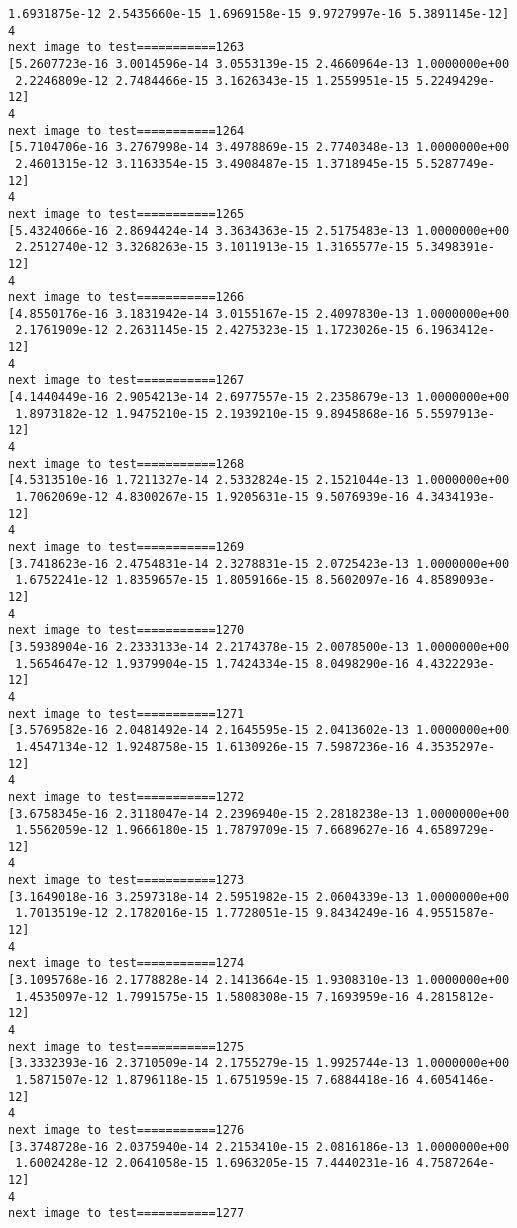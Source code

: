 \documentclass[11pt]{article}
\begin{document}
\begin{Verbatim}[commandchars=\\\{\}]
 1.6931875e-12 2.5435660e-15 1.6969158e-15 9.9727997e-16 5.3891145e-12]
4
next image to test===========1263
[5.2607723e-16 3.0014596e-14 3.0553139e-15 2.4660964e-13 1.0000000e+00
 2.2246809e-12 2.7484466e-15 3.1626343e-15 1.2559951e-15 5.2249429e-12]
4
next image to test===========1264
[5.7104706e-16 3.2767998e-14 3.4978869e-15 2.7740348e-13 1.0000000e+00
 2.4601315e-12 3.1163354e-15 3.4908487e-15 1.3718945e-15 5.5287749e-12]
4
next image to test===========1265
[5.4324066e-16 2.8694424e-14 3.3634363e-15 2.5175483e-13 1.0000000e+00
 2.2512740e-12 3.3268263e-15 3.1011913e-15 1.3165577e-15 5.3498391e-12]
4
next image to test===========1266
[4.8550176e-16 3.1831942e-14 3.0155167e-15 2.4097830e-13 1.0000000e+00
 2.1761909e-12 2.2631145e-15 2.4275323e-15 1.1723026e-15 6.1963412e-12]
4
next image to test===========1267
[4.1440449e-16 2.9054213e-14 2.6977557e-15 2.2358679e-13 1.0000000e+00
 1.8973182e-12 1.9475210e-15 2.1939210e-15 9.8945868e-16 5.5597913e-12]
4
next image to test===========1268
[4.5313510e-16 1.7211327e-14 2.5332824e-15 2.1521044e-13 1.0000000e+00
 1.7062069e-12 4.8300267e-15 1.9205631e-15 9.5076939e-16 4.3434193e-12]
4
next image to test===========1269
[3.7418623e-16 2.4754831e-14 2.3278831e-15 2.0725423e-13 1.0000000e+00
 1.6752241e-12 1.8359657e-15 1.8059166e-15 8.5602097e-16 4.8589093e-12]
4
next image to test===========1270
[3.5938904e-16 2.2333133e-14 2.2174378e-15 2.0078500e-13 1.0000000e+00
 1.5654647e-12 1.9379904e-15 1.7424334e-15 8.0498290e-16 4.4322293e-12]
4
next image to test===========1271
[3.5769582e-16 2.0481492e-14 2.1645595e-15 2.0413602e-13 1.0000000e+00
 1.4547134e-12 1.9248758e-15 1.6130926e-15 7.5987236e-16 4.3535297e-12]
4
next image to test===========1272
[3.6758345e-16 2.3118047e-14 2.2396940e-15 2.2818238e-13 1.0000000e+00
 1.5562059e-12 1.9666180e-15 1.7879709e-15 7.6689627e-16 4.6589729e-12]
4
next image to test===========1273
[3.1649018e-16 3.2597318e-14 2.5951982e-15 2.0604339e-13 1.0000000e+00
 1.7013519e-12 2.1782016e-15 1.7728051e-15 9.8434249e-16 4.9551587e-12]
4
next image to test===========1274
[3.1095768e-16 2.1778828e-14 2.1413664e-15 1.9308310e-13 1.0000000e+00
 1.4535097e-12 1.7991575e-15 1.5808308e-15 7.1693959e-16 4.2815812e-12]
4
next image to test===========1275
[3.3332393e-16 2.3710509e-14 2.1755279e-15 1.9925744e-13 1.0000000e+00
 1.5871507e-12 1.8796118e-15 1.6751959e-15 7.6884418e-16 4.6054146e-12]
4
next image to test===========1276
[3.3748728e-16 2.0375940e-14 2.2153410e-15 2.0816186e-13 1.0000000e+00
 1.6002428e-12 2.0641058e-15 1.6963205e-15 7.4440231e-16 4.7587264e-12]
4
next image to test===========1277

\end{Verbatim}
\end{document}
